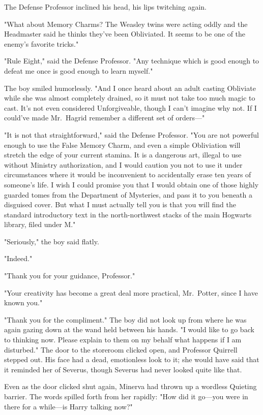 The Defense Professor inclined his head, his lips twitching again.

"What about Memory Charms? The Weasley twins were acting oddly and the
Headmaster said he thinks they've been Obliviated. It seems to be one of the
enemy's favorite tricks."

"Rule Eight," said the Defense Professor. "Any technique which is good enough
to defeat me once is good enough to learn myself."

The boy smiled humorlessly. "And I once heard about an adult casting Obliviate
while she was almost completely drained, so it must not take too much magic to
cast. It's not even considered Unforgiveable, though I can't imagine why not.
If I could've made Mr.~Hagrid remember a different set of orders\mbox{---}"

"It is not that straightforward," said the Defense Professor. "You are not
powerful enough to use the False Memory Charm, and even a simple Obliviation
will stretch the edge of your current stamina. It is a dangerous art, illegal
to use without Ministry authorization, and I would caution you not to use it
under circumstances where it would be inconvenient to accidentally erase ten
years of someone's life. I wish I could promise you that I would obtain one of
those highly guarded tomes from the Department of Mysteries, and pass it to you
beneath a disguised cover. But what I must actually tell you is that you will
find the standard introductory text in the north-northwest stacks of the main
Hogwarts library, filed under M."

"Seriously," the boy said flatly.

"Indeed."

"Thank you for your guidance, Professor."

"Your creativity has become a great deal more practical, Mr.~Potter, since I
have known you."

"Thank you for the compliment." The boy did not look up from where he was again
gazing down at the wand held between his hands. "I would like to go back to
thinking now. Please explain to them on my behalf what happens if I am
disturbed."
\sbreak
The door to the storeroom clicked open, and Professor Quirrell stepped out. His
face had a dead, emotionless look to it; she would have said that it reminded
her of Severus, though Severus had never looked quite like that.

Even as the door clicked shut again, Minerva had thrown up a wordless Quieting
barrier. The words spilled forth from her rapidly: "How did it go---you were in
there for a while---is Harry talking now?"

